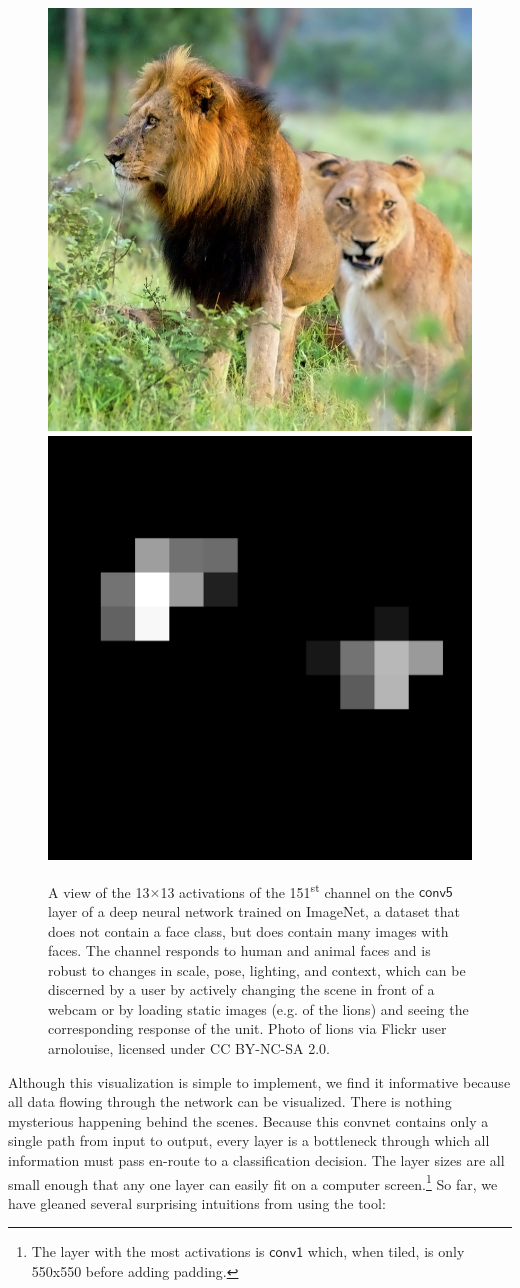 \documentclass{article}
\newcommand{\layer}[1]{\ensuremath{\mathsf{#1}\xspace}}
\begin{document}
\begin{figure}[!h]
\begin{center}
  \vspace{.5ex}
  \includegraphics[width=.5\linewidth]{demo_face/lions_arnolouise.jpg}\includegraphics[width=.5\linewidth]{demo_face/face_lions_arnolouise.png}
  \caption{A view of the 13$\times$13 activations of the 151\textsuperscript{st} channel on the \layer{conv5} layer of a deep neural network trained on ImageNet, a dataset that does not contain a face class, but does contain many images with faces. The channel  responds to human and animal faces and is robust to changes in scale, pose, lighting, and context, which can be discerned by a user by actively changing the scene in front of a webcam or by loading static images (e.g. of the lions) and seeing the corresponding response of the unit.
    Photo of lions via Flickr user arnolouise, licensed under CC BY-NC-SA 2.0.
  }
\end{center}
\vskip -0.2in
\end{figure}

Although this visualization is simple to implement, we find it informative because
all data flowing through the network can be visualized. There is nothing mysterious happening behind the scenes. Because this convnet contains only a single path from input to output, every layer is a bottleneck through which all information must pass en-route to a classification decision. The layer sizes are all small enough that any one layer can easily fit on a computer screen.\footnote{The layer with the most activations is \layer{conv1} which, when tiled, is only 550x550 before adding padding.} So far, we have gleaned several surprising intuitions from using the tool:
\end{document}
